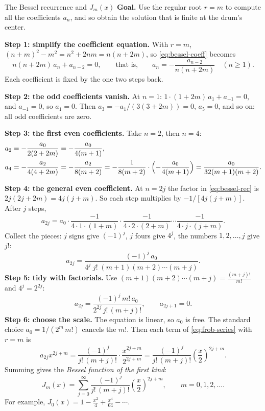 \documentclass[11pt]{beamer}
\begin{document}
\begin{frame}[allowframebreaks=1.00]{The Bessel recurrence and $J_m(x)$}
\footnotesize
\textbf{Goal.} Use the regular root \(r=m\) to compute all the coefficients \(a_n\), and so obtain the
solution that is finite at the drum's center.

\textbf{Step 1: simplify the coefficient equation.} With \(r=m\),
\((n+m)^2-m^2=n^2+2nm=n(n+2m)\), so \eqref{eq:bessel-coeff} becomes
\begin{equation}
 n(n+2m)\,a_n+a_{n-2}=0,\qquad\text{that is,}\qquad a_n=-\frac{a_{n-2}}{n(n+2m)}\quad(n\ge1).
 \label{eq:bessel-rec}
\end{equation}
Each coefficient is fixed by the one two steps back.

\textbf{Step 2: the odd coefficients vanish.} At \(n=1\): \(1\cdot(1+2m)\,a_1+a_{-1}=0\), and \(a_{-1}=0\), so
\(a_1=0\). Then \(a_3=-a_1/(3(3+2m))=0\), \(a_5=0\), and so on: all odd coefficients are zero.

\textbf{Step 3: the first even coefficients.} Take \(n=2\), then \(n=4\):
\[
\begin{aligned}
 a_2&=-\frac{a_0}{2(2+2m)}=-\frac{a_0}{4(m+1)},\\
 a_4&=-\frac{a_2}{4(4+2m)}=-\frac{a_2}{8(m+2)}
     =-\frac{1}{8(m+2)}\cdot\Bigl(-\frac{a_0}{4(m+1)}\Bigr)=\frac{a_0}{32(m+1)(m+2)}.
\end{aligned}
\]


\textbf{Step 4: the general even coefficient.} At \(n=2j\) the factor in \eqref{eq:bessel-rec} is
\(2j(2j+2m)=4j(j+m)\). So each step multiplies by \(-1/[4j(j+m)]\). After \(j\) steps,
\[
 a_{2j}=a_0\cdot\frac{-1}{4\cdot1\cdot(1+m)}\cdot\frac{-1}{4\cdot2\cdot(2+m)}\cdots\frac{-1}{4\cdot j\cdot(j+m)} .
\]
Collect the pieces: \(j\) signs give \((-1)^j\), \(j\) fours give \(4^j\), the numbers \(1,2,\dots,j\) give \(j!\):
\[
 a_{2j}=\frac{(-1)^j\,a_0}{4^{j}\;j!\;(m+1)(m+2)\cdots(m+j)} .
\]
\textbf{Step 5: tidy with factorials.} Use \((m+1)(m+2)\cdots(m+j)=\frac{(m+j)!}{m!}\) and \(4^j=2^{2j}\):
\begin{equation}
 a_{2j}=\frac{(-1)^j\,m!\,a_0}{2^{2j}\,j!\,(m+j)!},\qquad a_{2j+1}=0.
 \label{eq:bessel-coeffs}
\end{equation}
\textbf{Step 6: choose the scale.} The equation is linear, so \(a_0\) is free. The standard choice
\(a_0=1/(2^m\,m!)\) cancels the \(m!\). Then each term of \eqref{eq:frob-series} with \(r=m\) is
\[
 a_{2j}x^{2j+m}=\frac{(-1)^j}{j!\,(m+j)!}\cdot\frac{x^{2j+m}}{2^{2j+m}}
 =\frac{(-1)^j}{j!\,(m+j)!}\left(\frac{x}{2}\right)^{2j+m}.
\]
Summing gives the \emph{Bessel function of the first kind}:
\begin{equation}
 J_m(x)=\sum_{j=0}^{\infty}\frac{(-1)^j}{j!\,(m+j)!}
           \left(\frac{x}{2}\right)^{2j+m},\qquad m=0,1,2,\ldots.
 \label{eq:Jm}
\end{equation}
For example, \(J_0(x)=1-\frac{x^2}{4}+\frac{x^4}{64}-\cdots\).
\end{frame}
\end{document}
